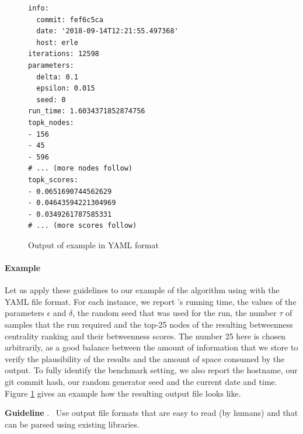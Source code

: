 \documentclass[algorithms,article,submit,moreauthors,pdftex]{Definitions/mdpi}
\newcounter{guideline}
\newcommand{\changed}[1]{#1}
\newcommand{\guideline}[1]{\par\smallskip\textbf{Guideline \theguideline\stepcounter{guideline}}.
\ #1\par\smallskip}
\begin{document}
\begin{figure}
\scriptsize
\begin{verbatim}
info:
  commit: fef6c5ca
  date: '2018-09-14T12:21:55.497368'
  host: erle
iterations: 12598
parameters:
  delta: 0.1
  epsilon: 0.015
  seed: 0
run_time: 1.6034371852874756
topk_nodes:
- 156
- 45
- 596
# ... (more nodes follow)
topk_scores:
- 0.0651690744562629
- 0.04643594221304969
- 0.0349261787585331
# ... (more scores follow)
\end{verbatim}
\caption{Output of \kad example in YAML format}
\label{fig:kadabra_outfile}
\end{figure}

\paragraph{\kad Example}
        Let us apply these guidelines to our example
	of the \kad algorithm using \exptool with the YAML file format.
	For each instance, we report \kad's running time,
	the values of the parameters $\epsilon$ and $\delta$,
	the random seed that was used for the run,
	the number $\tau$ of samples that the run required and the top-25 nodes of the resulting
	betweenness centrality ranking and their betweenness scores.
	The number 25 here is chosen arbitrarily, as a good balance between the amount of information
	that we store to verify the plausibility of the results and the amount of space
	consumed by the output. To fully identify the benchmark setting, we also report
	the hostname, our git commit hash, our random generator seed and the current date and time.
	Figure \ref{fig:kadabra_outfile} gives an example how the resulting output file looks like.

\changed{\guideline{Use output file formats that are easy to read (by humans)
	and that can be parsed using existing libraries.}}
\end{document}
